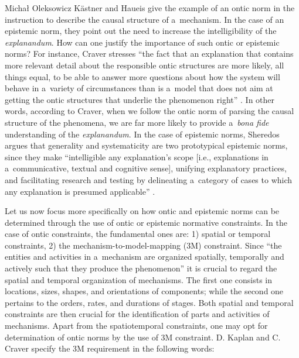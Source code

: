 \begin{artengenv}{Michał Oleksowicz}
Kästner and Haueis give the example of an ontic norm in the instruction to describe the causal structure of a~mechanism. In the case of an epistemic norm, they point out the need to increase the intelligibility of the \textit{explanandum}. How can one justify the importance of such ontic or epistemic norms? For instance, Craver stresses ``the fact that an explanation that contains more relevant detail about the responsible ontic structures are more likely, all things equal, to be able to answer more questions about how the system will behave in a~variety of circumstances than is a~model that does not aim at getting the ontic structures that underlie the phenomenon right''
\parencite[][p.41]{kaiser_ontic_2014}. %
 In other words, according to Craver, when we follow the ontic norm of parsing the causal structure of the phenomena, we are far more likely to provide a~\textit{bona fide} understanding of the \textit{explanandum}. In the case of epistemic norms, Sheredos argues that generality and systematicity are two prototypical epistemic norms, since they make ``intelligible any explanation's scope [i.e., explanations in a~communicative, textual and cognitive sense], unifying explanatory practices, and facilitating research and testing by delineating a~category of cases to which any explanation is presumed applicable'' 
\parencite[][p.933]{sheredos_re-reconciling_2016}.%


Let us now focus more specifically on how ontic and epistemic norms can be determined through the use of ontic or epistemic normative constraints. In the case of ontic constraints, the fundamental ones are: 1) spatial or temporal constraints, 2) the mechanism-to-model-mapping (3M) constraint. Since ``the entities and activities in a~mechanism are organized spatially, temporally and actively such that they produce the phenomenon''
\parencite[][p.20]{craver_search_2013} %
 it is crucial to regard the spatial and temporal organization of mechanisms. The first one consists in locations, sizes, shapes, and orientations of components; while the second one pertains to the orders, rates, and durations of stages. Both spatial and temporal constraints are then crucial for the identification of parts and activities of mechanisms. Apart from the spatiotemporal constraints, one may opt for determination of ontic norms by the use of 3M constraint. D. Kaplan and C. Craver specify the 3M requirement in the following words:


\end{artengenv}
